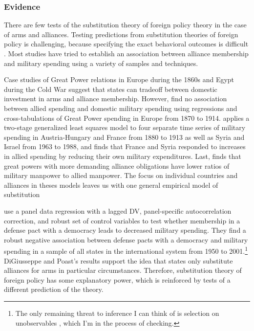\documentclass[12pt]{article}
\begin{document}
\subsubsection{Evidence}


There are few tests of the substitution theory of foreign policy theory in the case of arms and alliances. 
Testing predictions from substitution theories of foreign policy is challenging, because specifying the exact behavioral outcomes is difficult \citep{Starr2000}. 
Most studies have tried to establish an association between alliance membership and military spending using a variety of samples and techniques. 

Case studies of Great Power relations in Europe during the 1860s \citep{Morrow1993} and Egypt during the Cold War \citep{BarnettLevy1991} suggest that states can tradeoff between domestic investment in arms and alliance membership. However, \citet{MostSiverson1987} find no association between allied spending and domestic military spending using regressions and cross-tabulations of Great Power spending in Europe from 1870 to 1914. 
\citet{Sorokin1994} applies a two-stage generalized least squares model to four separate time series of military spending in Austria-Hungary and France from 1880 to 1913 as well as Syria and Israel from 1963 to 1988, and finds that France and Syria responded to increases in allied spending by reducing their own military expenditures. 
Last, \citet{Conybeare1994} finds that great powers with more demanding alliance obligations have lower ratios of military manpower to allied manpower. 
The focus on individual countries and alliances in theses models leaves us with one general empirical model of substitution


\citet{DigiuseppePoast2016} use a panel data regression with a lagged DV, panel-specific autocorrelation correction, and robust set of control variables to test whether membership in a defense pact with a democracy leads to decreased military spending. 
They find a robust negative association between defense pacts with a democracy and military spending in a sample of all states in the international system from 1950 to 2001.\footnote{The only remaining threat to inference I can think of is selection on unobservables \citep{Chaudoinetal2016}, which I'm in the process of checking.} 
DiGiusseppe and Poast's results support the idea that states only substitute alliances for arms in particular circumstances.
Therefore, substitution theory of foreign policy has some explanatory power, which is reinforced by tests of a different prediction of the theory. 
\end{document}

